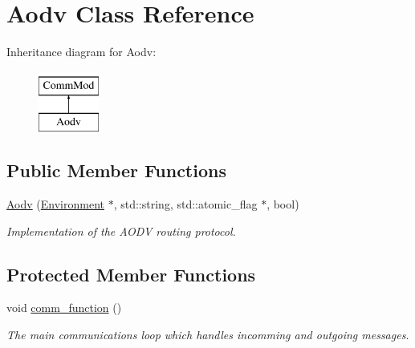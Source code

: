 \hypertarget{class_aodv}{}\section{Aodv Class Reference}
\label{class_aodv}
Inheritance diagram for Aodv\+:\begin{figure}[H]
\begin{center}
\leavevmode
\includegraphics[height=2.000000cm]{class_aodv}
\end{center}
\end{figure}
\subsection*{Public Member Functions}
\begin{DoxyCompactItemize}
\item 
\hyperlink{class_aodv_a073bdb20f841313c807cb0fed8e28ef7}{Aodv} (\hyperlink{class_environment}{Environment} $\ast$, std\+::string, std\+::atomic\+\_\+flag $\ast$, bool)\hypertarget{class_aodv_a073bdb20f841313c807cb0fed8e28ef7}{}\label{class_aodv_a073bdb20f841313c807cb0fed8e28ef7}

\begin{DoxyCompactList}\small\item\em Implementation of the A\+O\+DV routing protocol. \end{DoxyCompactList}\end{DoxyCompactItemize}
\subsection*{Protected Member Functions}
\begin{DoxyCompactItemize}
\item 
void \hyperlink{class_aodv_a747648e75a01803732affdccc8c03bef}{comm\+\_\+function} ()
\begin{DoxyCompactList}\small\item\em The main communications loop which handles incomming and outgoing messages. \end{DoxyCompactList}\end{DoxyCompactItemize}
